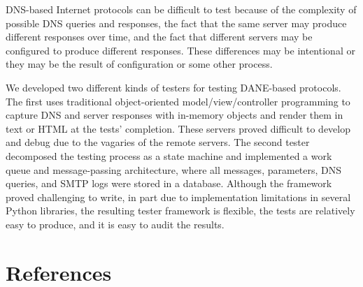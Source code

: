 \documentclass[preprint,3p,11pt]{elsarticle}
\begin{document}
DNS-based Internet protocols can be difficult to test because of the
complexity of possible DNS queries and responses, the fact that
the same server may produce different responses over time, and the
fact that different servers may be configured to produce different
responses. These differences may be intentional or they may be the
result of configuration or some other process. 

We developed two different kinds of testers for testing DANE-based
protocols. The first uses traditional object-oriented
model/view/controller programming to capture DNS and server responses
with in-memory objects and render them in text or HTML at the tests'
completion. These servers proved difficult to develop and debug due to
the vagaries of the remote servers. The second tester decomposed the
testing process as a state machine and implemented a work queue and message-passing
architecture, where all messages, parameters, DNS queries, and SMTP
logs were stored in a database. Although the framework proved
challenging to write, in part due to implementation limitations in several
Python libraries, the resulting tester framework is flexible, the
tests are relatively easy to produce, and it is easy to audit the results.



\section*{References}


\end{document}
